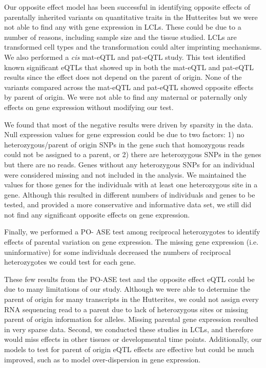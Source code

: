 Our opposite effect model has been successful in identifying opposite effects of parentally inherited variants on quantitative traits in the Hutterites but we were not able to find any with gene expression in LCLs. These could be due to a number of reasons, including sample size and the tissue studied. LCLs are transformed cell types and the transformation could alter imprinting mechanisms. We also performed a \emph{cis} mat-eQTL and pat-eQTL study. This test identified known significant eQTLs that showed up in both the mat-eQTL and pat-eQTL results since the effect does not depend on the parent of origin. None of the variants compared across the mat-eQTL and pat-eQTL showed opposite effects by parent of origin. We were not able to find any maternal or paternally only effects on gene expression without modifying our test.

We found that most of the negative results were driven by sparsity in the data. Null expression values for gene expression could be due to two factors: 1) no heterozygous/parent of origin SNPs in the gene such that homozygous reads could not be assigned to a parent, or 2) there are heterozygous SNPs in the genes but there are no reads. Genes without any heterozygous SNPs for an individual were considered missing and not included in the analysis. We maintained the values for those genes for the individuals with at least one heterozygous site in a gene. Although this resulted in different numbers of individuals and genes to be tested, and provided a more conservative and informative data set, we still did not find any significant opposite effects on gene expression.

Finally, we performed a PO- ASE test among reciprocal heterozygotes to identify effects of parental variation on gene expression. The missing gene expression (i.e. uninformative) for some individuals decreased the numbers of reciprocal heterozygotes we could test for each gene.

These few results from the PO-ASE test and the opposite effect eQTL could be due to many limitations of our study. Although we were able to determine the parent of origin for many transcripts in the Hutterites, we could not assign every RNA sequencing read to a parent due to lack of heterozygous sites or missing parent of origin information for alleles. Missing parental gene expression resulted in very sparse data. Second, we conducted these studies in LCLs, and therefore would miss effects in other tissues or developmental time points. Additionally, our models to test for parent of origin eQTL effects are effective but could be much improved, such as to model over-dispersion in gene expression.

